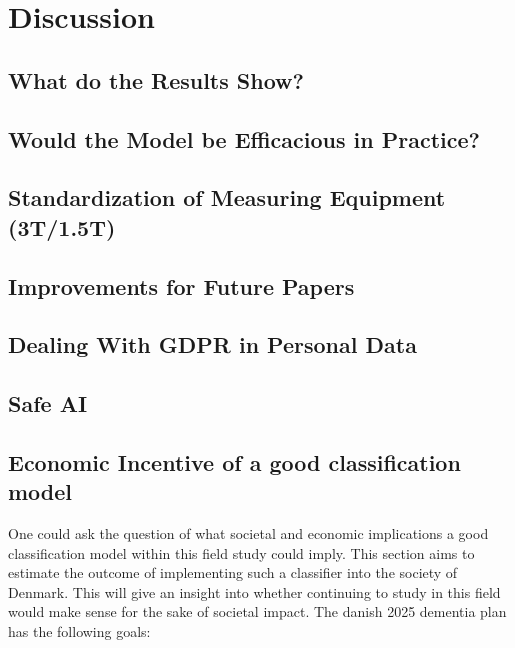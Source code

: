 \documentclass[12pt, fleqn, titlepage]{article}
\begin{document}
\section{Discussion}\label{discussion}

\subsection{What do the Results Show?}\label{discussionOfResults}

\subsection{Would the Model be Efficacious in Practice?}


\subsection{Standardization of Measuring Equipment (3T/1.5T)}

\subsection{Improvements for Future Papers}


\subsection{Dealing With GDPR in Personal Data}


\subsection{Safe AI}

\subsection{Economic Incentive of a good classification model}

One could ask the question of what societal and economic implications a good classification model within this field study could imply. This section aims to estimate the outcome of implementing such a classifier into the society of Denmark. This will give an insight into whether continuing to study in this field would make sense for the sake of societal impact. The danish 2025 dementia plan has the following goals:
\end{document}
